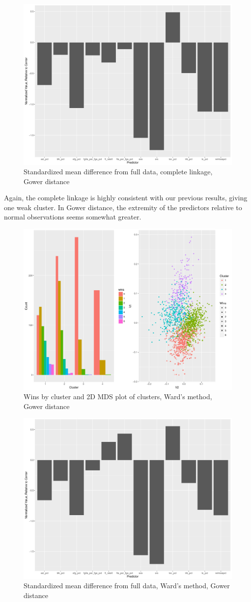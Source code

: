 \documentclass[10pt,a4paper, hidelinks]{article} %
\begin{document}
\begin{figure}[H]
	\centering
	\includegraphics[width=0.7\linewidth]{../fig/compweak3}
	\caption{Standardized mean difference from full data, complete linkage, Gower distance}
\end{figure}

Again, the complete linkage is highly consistent with our previous results, giving one weak cluster.  In Gower distance, the extremity of the predictors relative to normal observations seems somewhat greater.

\begin{figure}[H]
	\centering
	\includegraphics[width=0.7\linewidth]{../fig/ward3}
	\caption{Wins by cluster and 2D MDS plot of clusters, Ward's method, Gower distance}
\end{figure}

\begin{figure}[H]
	\centering
	\includegraphics[width=0.7\linewidth]{../fig/wardweak3}
	\caption{Standardized mean difference from full data, Ward's method, Gower distance}
\end{figure}
\end{document}

